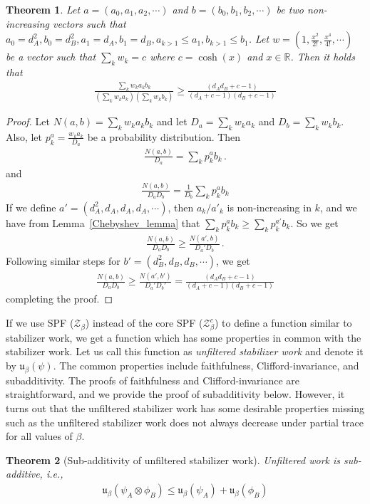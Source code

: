 \documentclass[aps,pra,superscriptaddress,twocolumn,longbibliography]{revtex4-2}
\newcommand{\eqs}[1]{\begin{align}#1\end{align}}
\newtheorem{theorem}{\textbf{Theorem}}
\def\mZ{\mathcal{Z}}
\def\mbR{\mathbb{R}}
\begin{document}
\begin{theorem}\label{sub-additivity_supporting_thm}
    Let $a=(a_0,a_1,a_2,\cdots)$ and $b=(b_0,b_1,b_2,\cdots)$ be two non-increasing vectors such that $a_0 = d_A^2, b_0 = d_B^2, a_1 = d_A, b_1 = d_B, a_{k>1}\leq a_1, b_{k>1}\leq b_1$.
    Let $w = (1, \frac{x^2}{2!}, \frac{x^4}{4!},\cdots)$ be a vector such that $\sum_k w_k = c$ where $c = \cosh(x)$ and $x\in \mbR$. Then it holds that
    \eqs{
    \frac{\sum_k w_k a_k b_k}{(\sum_k w_k a_k)(\sum_k w_k b_k)}\geq \frac{(d_Ad_B+c-1)}{(d_A+c-1)(d_B+c-1)}
    }
\end{theorem}
\begin{proof}
    Let $N(a,b) = \sum_k w_k a_k b_k$ and let $D_a = \sum_k w_k a_k$ and $D_b = \sum_k w_k b_k$.
    Also, let $p_k^a = \frac{w_ka_k}{D_a}$ be a probability distribution. Then
    \eqs{
    \frac{N(a,b)}{D_a} = \sum_k p^a_k b_k\,.
    }
    and \eqs{
    \frac{N(a,b)}{D_aD_b} = \frac{1}{D_b}\sum_k p^a_k b_k
    }
    If we define $a' = (d^2_A, d_A, d_A, d_A, \cdots)$, then $a_k/a'_k$ is non-increasing in $k$, and we have from Lemma~\ref{Chebyshev_lemma} that $\sum_k p^a_kb_k\geq \sum_k p^{a'}_k b_k$.
    So we get
    \eqs{
    \frac{N(a,b)}{D_a D_b}\geq \frac{N(a',b)}{D_a' D_b}\,.
    }
    Following similar steps for $b' = (d^2_B, d_B, d_B,\cdots)$, we get
    \eqs{
    \frac{N(a,b)}{D_a D_b}\geq \frac{N(a',b')}{D_a' D_b'} = \frac{(d_Ad_B+c-1)}{(d_A+c-1)(d_B+c-1)}
    }
    completing the proof.
\end{proof}
If we use SPF ($\mZ_{\beta}$) instead of the core SPF ($\mZ_{\beta}^c$) to define a function similar to stabilizer work, we get a function which has some properties in common with the stabilizer work. Let us call this function as \textit{unfiltered stabilizer work} and denote it by $\mathfrak{u}_{\beta}(\psi)$. The common properties include faithfulness, Clifford-invariance, and subadditivity. The proofs of faithfulness and Clifford-invariance are straightforward, and we provide the proof of subadditivity below. However, it turns out that the unfiltered stabilizer work has some desirable properties missing such as the unfiltered stabilizer work does not always decrease under partial trace for all values of $\beta$. 
\begin{theorem}[Sub-additivity of unfiltered stabilizer work]
    Unfiltered work is sub-additive, i.e.,
    \eqs{
    \mathfrak{u}_{\beta}(\psi_A \otimes \phi_B)\leq  \mathfrak{u}_{\beta}(\psi_{A}) + \mathfrak{u}_{\beta}(\phi_{B})
    }
\end{theorem}
\end{document}
